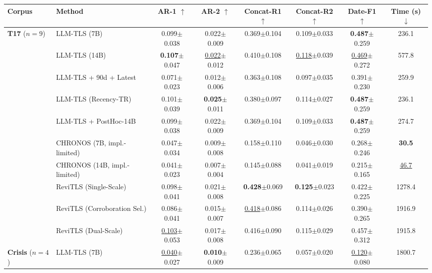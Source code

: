 \begin{tabular}{@{}llcccccc@{}}
\toprule
\textbf{Corpus} & \textbf{Method} & \textbf{AR-1} $\uparrow$ & \textbf{AR-2} $\uparrow$ & \textbf{Concat-R1} $\uparrow$ & \textbf{Concat-R2} $\uparrow$ & \textbf{Date-F1} $\uparrow$ & \textbf{Time (s)} $\downarrow$ \\
\midrule
\multirow{10}{*}{\textbf{T17} ($n=9$)} & LLM-TLS (7B) & 0.099{\tiny$\pm$0.038} & 0.022{\tiny$\pm$0.009} & 0.369{\tiny$\pm$0.104} & 0.109{\tiny$\pm$0.033} & \textbf{0.487}{\tiny$\pm$0.259} & 236.1 \\
  & LLM-TLS (14B) & \textbf{0.107}{\tiny$\pm$0.047} & \underline{0.022}{\tiny$\pm$0.012} & 0.410{\tiny$\pm$0.108} & \underline{0.118}{\tiny$\pm$0.039} & \underline{0.469}{\tiny$\pm$0.272} & 577.8 \\
  & LLM-TLS + 90d + Latest & 0.071{\tiny$\pm$0.023} & 0.012{\tiny$\pm$0.006} & 0.363{\tiny$\pm$0.108} & 0.097{\tiny$\pm$0.035} & 0.391{\tiny$\pm$0.230} & 259.9 \\
  & LLM-TLS (Recency-TR) & 0.101{\tiny$\pm$0.039} & \textbf{0.025}{\tiny$\pm$0.011} & 0.380{\tiny$\pm$0.097} & 0.114{\tiny$\pm$0.027} & \textbf{0.487}{\tiny$\pm$0.259} & 236.1 \\
  & LLM-TLS + PostHoc-14B & 0.099{\tiny$\pm$0.038} & 0.022{\tiny$\pm$0.009} & 0.369{\tiny$\pm$0.104} & 0.109{\tiny$\pm$0.033} & \textbf{0.487}{\tiny$\pm$0.259} & 274.7 \\
  & CHRONOS (7B, impl.-limited) & 0.047{\tiny$\pm$0.034} & 0.009{\tiny$\pm$0.008} & 0.158{\tiny$\pm$0.110} & 0.046{\tiny$\pm$0.030} & 0.268{\tiny$\pm$0.246} & \textbf{30.5} \\
  & CHRONOS (14B, impl.-limited) & 0.041{\tiny$\pm$0.023} & 0.007{\tiny$\pm$0.004} & 0.145{\tiny$\pm$0.088} & 0.041{\tiny$\pm$0.019} & 0.215{\tiny$\pm$0.165} & \underline{46.7} \\
  & ReviTLS (Single-Scale) & 0.098{\tiny$\pm$0.041} & 0.021{\tiny$\pm$0.008} & \textbf{0.428}{\tiny$\pm$0.069} & \textbf{0.125}{\tiny$\pm$0.023} & 0.422{\tiny$\pm$0.225} & 1278.4 \\
  & ReviTLS (Corroboration Sel.) & 0.086{\tiny$\pm$0.041} & 0.015{\tiny$\pm$0.007} & \underline{0.418}{\tiny$\pm$0.086} & 0.114{\tiny$\pm$0.026} & 0.390{\tiny$\pm$0.265} & 1916.9 \\
  & ReviTLS (Dual-Scale) & \underline{0.103}{\tiny$\pm$0.053} & 0.017{\tiny$\pm$0.008} & 0.416{\tiny$\pm$0.090} & 0.115{\tiny$\pm$0.029} & 0.457{\tiny$\pm$0.312} & 1915.8 \\
\midrule
\multirow{10}{*}{\textbf{Crisis} ($n=4$)} & LLM-TLS (7B) & \underline{0.040}{\tiny$\pm$0.027} & \textbf{0.010}{\tiny$\pm$0.009} & 0.236{\tiny$\pm$0.065} & 0.057{\tiny$\pm$0.020} & \underline{0.120}{\tiny$\pm$0.080} & 1800.7 \\

\end{tabular}
